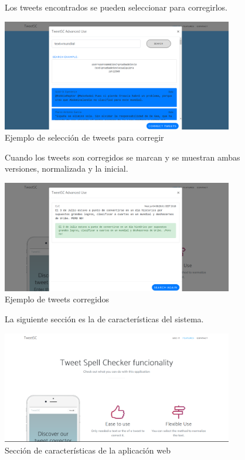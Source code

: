 \documentclass[spanish,12pt, a4paper,twoside]{paper}
\begin{document}
\begin{figure}[h]
Los tweets encontrados se pueden seleccionar para corregirlos.
\begin{center}
 \includegraphics[width=0.9\textwidth]{recursos/WebUseIt_AdvancedUse_TweetsSelected.png}
\caption{Ejemplo de selección de tweets para corregir}
\label{fig:webuseitadvancedusetweetselected}
\end{center}
\end{figure}

\begin{figure}[h]
Cuando los tweets son corregidos se marcan y se muestran ambas versiones, normalizada y la inicial.
\begin{center}
 \includegraphics[width=0.9\textwidth]{recursos/WebUseIt_AdvancedUse_TweetCorrected.png}
\caption{Ejemplo de tweets corregidos}
\label{fig:webuseitadvancedusetweetcorrected}
\end{center}
\end{figure}

\begin{figure}[h]
La siguiente sección es la de características del sistema.
\begin{center}
 \includegraphics[width=0.9\textwidth]{recursos/WebFeatures1}
\caption{Sección de características de la aplicación web}
\label{fig:webfeatures1}
\end{center}
\end{figure}
\end{document}
